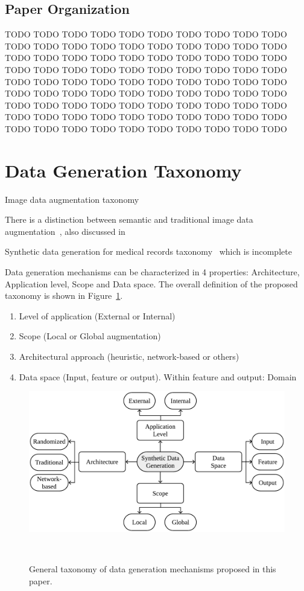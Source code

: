 \documentclass[parskip=full]{scrartcl}
\begin{document}

\subsection{Paper Organization}

TODO TODO TODO TODO TODO TODO TODO TODO TODO TODO TODO TODO TODO TODO TODO
TODO TODO TODO TODO TODO TODO TODO TODO TODO TODO TODO TODO TODO TODO TODO
TODO TODO TODO TODO TODO TODO TODO TODO TODO TODO TODO TODO TODO TODO TODO
TODO TODO TODO TODO TODO TODO TODO TODO TODO TODO TODO TODO TODO TODO TODO
TODO TODO TODO TODO TODO TODO TODO TODO TODO TODO TODO TODO TODO TODO TODO
TODO TODO TODO TODO TODO TODO TODO TODO TODO TODO TODO TODO TODO TODO TODO

\section{Data Generation Taxonomy}

Image data augmentation taxonomy~\cite{khalifa2021comprehensive}

There is a distinction between semantic and traditional image data
augmentation~\cite{wang2021regularizing}, also discussed
in~\cite{shorten2019survey} 

Synthetic data generation for medical records
taxonomy~\cite{hernandez2022synthetic} which is incomplete



Data generation mechanisms can be characterized in 4 properties: Architecture,
Application level, Scope and Data space. The overall definition of the
proposed taxonomy is shown in Figure~\ref{fig:data-generation-taxonomy}.

\begin{enumerate}
    \item Level of application (External or Internal)
    \item Scope (Local or Global augmentation)
    \item Architectural approach (heuristic, network-based or others)
    \item Data space (Input, feature or output). Within feature and output: Domain
\end{enumerate}

\begin{figure}
	\centering
	\includegraphics[width=.8\linewidth]{../analysis/data-generation-taxonomy}
    \caption{General taxonomy of data generation mechanisms proposed in this
        paper.
    }~\label{fig:data-generation-taxonomy}
\end{figure}
\end{document}
